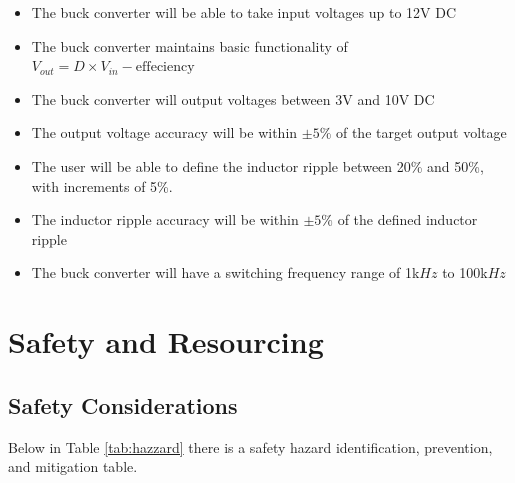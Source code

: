 \documentclass[11pt, a4paper, twoside, openright]{report}
\begin{document}
\begin{itemize}
	\item The buck converter will be able to take input voltages up to 12V DC
	
	\item The buck converter maintains basic functionality of $V_{out} = D\times V_{in} - \mathrm{effeciency}$

	\item The buck converter will output voltages between 3V and 10V DC
	
	\item The output voltage accuracy will be within $\pm 5\%$ of the target output voltage

	\item The user will be able to define the inductor ripple between 20\% and 50\%, with increments of 5\%.
	
	\item The inductor ripple accuracy will be within $\pm 5\%$ of the defined inductor ripple
	
	\item The buck converter will have a switching frequency range of 1k$Hz$ to 100k$Hz$
\end{itemize}

\section{Safety and Resourcing}

\subsection{Safety Considerations}

Below in Table \ref{tab:hazzard} there is a safety hazard identification, prevention, and mitigation table.
\end{document}
